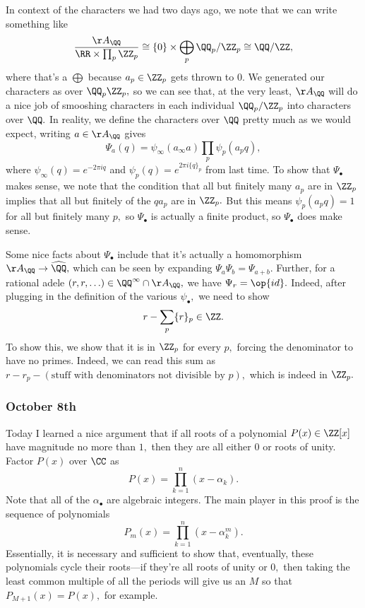 In context of the characters we had two days ago, we note that we can write something like
\[\frac{\AA_\QQ}{\RR\times\prod_p\ZZ_p}\cong\{0\}\times\bigoplus_p\QQ_p/\ZZ_p\cong\QQ/\ZZ,\]
where that's a $\bigoplus$ because $a_p\in\ZZ_p$ gets thrown to $0.$ We generated our characters as over $\QQ_p\ZZ_p,$ so we can see that, at the very least, $\AA_\QQ$ will do a nice job of smooshing characters in each individual $\QQ_p/\ZZ_p$ into characters over $\QQ.$ In reality, we define the characters over $\QQ$ pretty much as we would expect, writing  $a\in\AA_\QQ$ gives
\[\Psi_a(q)=\psi_\infty(a_\infty a)\prod_p\psi_p(a_pq),\]
where $\psi_\infty(q)=e^{-2\pi iq}$ and $\psi_p(q)=e^{2\pi i\{q\}_p}$ from last time. To show that $\Psi_\bullet$ makes sense, we note that the condition that all but finitely many $a_p$ are in $\ZZ_p$ implies that all but finitely of the $qa_p$ are in $\ZZ_p.$ But this means $\psi_p(a_pq)=1$ for all but finitely many $p,$ so $\Psi_\bullet$ is actually a finite product, so $\Psi_\bullet$ does make sense.

Some nice facts about $\Psi_\bullet$ include that it's actually a homomorphism $\AA_\QQ\to\widehat\QQ,$ which can be seen by expanding $\Psi_a\Psi_b=\Psi_{a+b}.$ Further, for a rational adele $(r,r,\ldots)\in\QQ^\infty\cap\AA_\QQ,$ we have $\Psi_r=\op{id}.$ Indeed, after plugging in the definition of the various $\psi_\bullet,$ we need to show
\[r-\sum_p\{r\}_p\in\ZZ.\]
To show this, we show that it is in $\ZZ_p$ for every $p,$ forcing the denominator to have no primes. Indeed, we can read this sum as $r-r_p-(\text{stuff with denominators not divisible by }p),$ which is indeed in $\ZZ_p.$

\subsubsection{October 8th}
Today I learned a nice argument that if all roots of a polynomial $P(x)\in\ZZ[x]$ have magnitude no more than $1,$ then they are all either $0$ or roots of unity. Factor $P(x)$ over $\CC$ as
\[P(x)=\prod_{k=1}^n(x-\alpha_k).\]
Note that all of the $\alpha_\bullet$ are algebraic integers. The main player in this proof is the sequence of polynomials
\[P_m(x)=\prod_{k=1}^n\left(x-\alpha_k^m\right).\]
Essentially, it is necessary and sufficient to show that, eventually, these polynomials cycle their roots---if they're all roots of unity or $0,$ then taking the least common multiple of all the periods will give us an $M$ so that $P_{M+1}(x)=P(x),$ for example.

